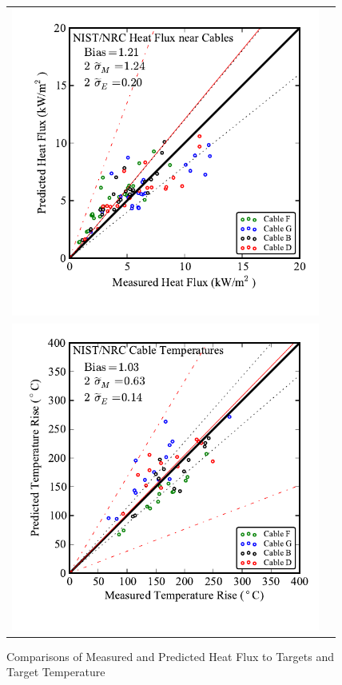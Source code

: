 \begin{figure}[p]
\begin{center}
\begin{tabular}{lr}
\includegraphics[width=4in]{FIGURES/ScatterPlots/NIST_NRC_Heat_Flux} &   \\
\includegraphics[width=4in]{FIGURES/ScatterPlots/Cable_Temperature} &  \\
\end{tabular}
\end{center}
\caption{Comparisons of Measured and Predicted Heat Flux to Targets and Target Temperature} \label{fig:Target_Scatter}
\end{figure}

